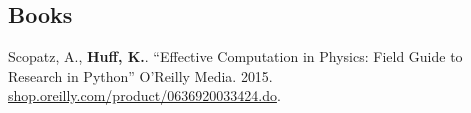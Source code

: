 \documentclass[margin,line]{resume}
\begin{document}
\begin{resume}
               \vspace{-2mm}
    \section{\mysidestyle Books}
      \begin{bibenum}
      \item Scopatz, A., \textbf{Huff, K.}. ``Effective Computation in
      Physics: Field Guide to Research in Python'' O'Reilly Media. 2015.
      \url{shop.oreilly.com/product/0636920033424.do}.
      \end{bibenum}

\end{resume}
\end{document}
